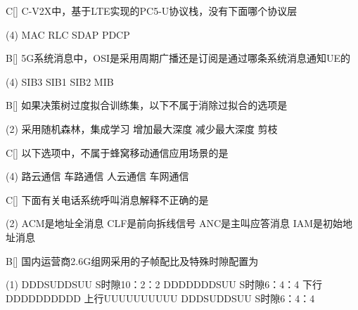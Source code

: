 \begin{choice}{C}[]
    C-V2X中，基于LTE实现的PC5-U协议栈，没有下面哪个协议层
    \begin{tasks}(4)
        \task MAC
        \task RLC
        \task SDAP
        \task PDCP
    \end{tasks}
\end{choice}

\begin{choice}{B}[]
    5G系统消息中，OSI是采用周期广播还是订阅是通过哪条系统消息通知UE的
    \begin{tasks}(4)
        \task SIB3
        \task SIB1
        \task SIB2
        \task MIB
    \end{tasks}
\end{choice}


\begin{choice}{B}[]
    如果决策树过度拟合训练集，以下不属于消除过拟合的选项是
    \begin{tasks}(2)
        \task 采用随机森林，集成学习
        \task 增加最大深度
        \task 减少最大深度
        \task 剪枝
    \end{tasks}
\end{choice}


\begin{choice}{C}[]
    以下选项中，不属于蜂窝移动通信应用场景的是
    \begin{tasks}(4)
        \task 路云通信
        \task 车路通信
        \task 人云通信
        \task 车网通信
    \end{tasks}
\end{choice}



\begin{choice}{C}[]
    下面有关电话系统呼叫消息解释不正确的是
    \begin{tasks}(2)
        \task ACM是地址全消息
        \task CLF是前向拆线信号
        \task ANC是主叫应答消息
        \task IAM是初始地址消息
    \end{tasks}
\end{choice}



\begin{choice}{B}[]
    国内运营商2.6G组网采用的子帧配比及特殊时隙配置为
    \begin{tasks}(1)
        \task DDDSUDDSUU S时隙10：2：2
        \task DDDDDDDSUU S时隙6：4：4
        \task 下行DDDDDDDDDD 上行UUUUUUUUUU
        \task DDDSUDDSUU S时隙6：4：4
    \end{tasks}
\end{choice}



